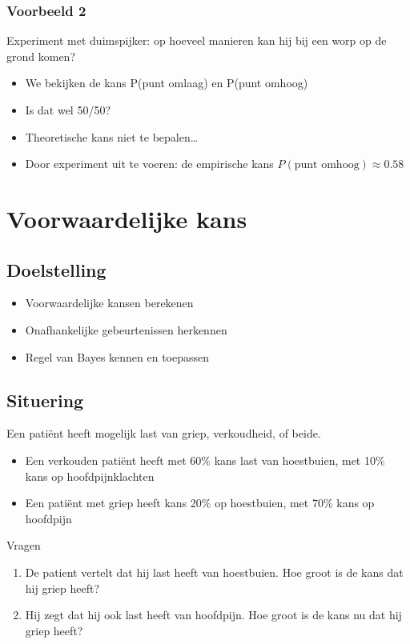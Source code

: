 \documentclass{article}
\begin{document}
\subsubsection{Voorbeeld 2}

Experiment met duimspijker: op hoeveel manieren kan hij bij een worp op de grond komen?

\begin{itemize}
    \item We bekijken de kans P(punt omlaag) en P(punt omhoog)
    \item Is dat wel 50/50?
    \item Theoretische kans niet te bepalen\dots
    \item Door experiment uit te voeren: de empirische kans $P(\text{punt omhoog}) \approx 0.58$
\end{itemize}

\section{Voorwaardelijke kans}

\subsection{Doelstelling}

\begin{itemize}
    \item Voorwaardelijke kansen berekenen
    \item Onafhankelijke gebeurtenissen herkennen
    \item Regel van Bayes kennen en  toepassen
\end{itemize}

\subsection{Situering}

Een patiënt heeft mogelijk last van griep, verkoudheid, of beide.

\begin{itemize}
    \item Een verkouden patiënt heeft met 60\% kans last van hoestbuien, met 10\% kans op hoofdpijnklachten
    \item Een patiënt met griep heeft kans 20\% op hoestbuien, met 70\% kans op hoofdpijn
\end{itemize}

Vragen

\begin{enumerate}
    \item De patient vertelt dat hij last heeft van hoestbuien. Hoe groot is de kans dat hij griep heeft?
    \item Hij zegt dat hij ook last heeft van hoofdpijn. Hoe groot is de kans nu dat hij griep heeft?
\end{enumerate}
\end{document}
